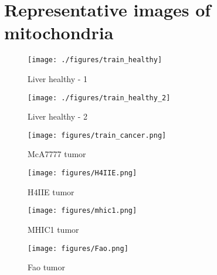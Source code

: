 	 \section{Representative images of mitochondria}		
		
	\begin{figure}[th!]
		  
		 \centering
		        \begin{minipage}[b]{0.48\textwidth}
		                \texttt{[image: ./figures/train\_healthy]}%
		                \caption{Liver healthy - 1}
		                         \label{fig:healthy_liver_1}
		    \end{minipage}
		\hfill    
		    \begin{minipage}[b]{0.48\textwidth}
		                \texttt{[image: ./figures/train\_healthy\_2]}%
		                \caption{Liver healthy - 2}
		                         \label{fig:healthy_liver_2}
		    \end{minipage}
		    
		\hfill
		\begin{minipage}[b]{0.48\textwidth}
		        \centering
		                        \texttt{[image: figures/train\_cancer.png]}%
		
		                        \caption{McA7777 tumor}
		                                         \label{fig:train_cancer}
		      \end{minipage}
		\hfill 
		\begin{minipage}[b]{0.48\textwidth}
		                \texttt{[image: figures/H4IIE.png]}%
		                \caption{H4IIE tumor}
		                \label{fig:h4iie_cancer}
		    \end{minipage}
		\hfill
		\begin{minipage}[b]{0.48\textwidth}
		                \texttt{[image: figures/mhic1.png]}%
		
		                 \caption{MHIC1 tumor}
		                         \label{fig:mhic1_cancer}
		\end{minipage}
		\hfill
		\begin{minipage}[b]{0.48\textwidth}
		                \texttt{[image: figures/Fao.png]}%
		                 \caption{Fao tumor}
		                         \label{fig:fao_cancer}
		   \end{minipage}
		
		
		\end{figure}
